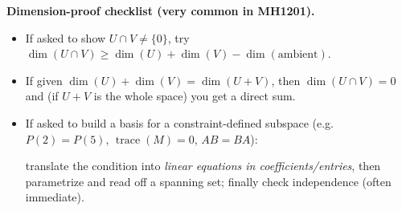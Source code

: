 \begin{examtip}

\textbf{Dimension-proof checklist (very common in MH1201).}

\begin{itemize}

\item If asked to show $U\cap V\neq\{0\}$, try $\dim(U\cap V)\ge \dim(U)+\dim(V)-\dim(\text{ambient})$.

\item If given $\dim(U)+\dim(V)=\dim(U+V)$, then $\dim(U\cap V)=0$ and (if $U+V$ is the whole space) you get a direct sum.

\item If asked to build a basis for a constraint-defined subspace (e.g.\ $P(2)=P(5)$, $\operatorname{trace}(M)=0$, $AB=BA$):

translate the condition into \emph{linear equations in coefficients/entries}, then parametrize and read off a spanning set; finally check independence (often immediate).

\end{itemize}

\end{examtip}

